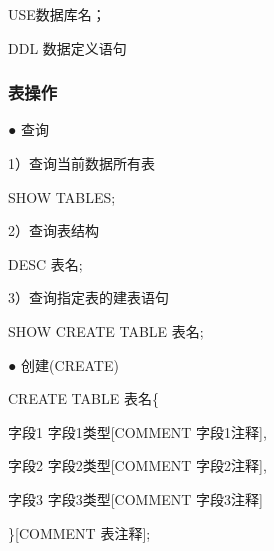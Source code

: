 \documentclass[
  letterpaper,
  DIV=11,
  numbers=noendperiod]{scrreprt}
\newenvironment{Shaded}{\begin{snugshade}}{\end{snugshade}}
\newcommand{\KeywordTok}[1]{\textcolor[rgb]{0.00,0.23,0.31}{#1}}
\newcommand{\NormalTok}[1]{\textcolor[rgb]{0.00,0.23,0.31}{#1}}
\begin{document}
\begin{Shaded}
\begin{Highlighting}[]
\NormalTok{USE数据库名；}
\end{Highlighting}
\end{Shaded}

DDL 数据定义语句

\hypertarget{ux8868ux64cdux4f5c}{%
\subsubsection{表操作}\label{ux8868ux64cdux4f5c}}

● 查询

1）查询当前数据所有表

\begin{Shaded}
\begin{Highlighting}[]
\NormalTok{SHOW }\KeywordTok{TABLES}\NormalTok{;}
\end{Highlighting}
\end{Shaded}

2）查询表结构

\begin{Shaded}
\begin{Highlighting}[]
\KeywordTok{DESC}\NormalTok{ 表名;}
\end{Highlighting}
\end{Shaded}

3）查询指定表的建表语句

\begin{Shaded}
\begin{Highlighting}[]
\NormalTok{SHOW }\KeywordTok{CREATE} \KeywordTok{TABLE}\NormalTok{ 表名;}
\end{Highlighting}
\end{Shaded}

● 创建(CREATE)

\begin{Shaded}
\begin{Highlighting}[]
\KeywordTok{CREATE} \KeywordTok{TABLE}\NormalTok{ 表名\{}

\NormalTok{字段1 字段1类型[}\KeywordTok{COMMENT}\NormalTok{ 字段1注释],}

\NormalTok{字段2 字段2类型[}\KeywordTok{COMMENT}\NormalTok{ 字段2注释],}

\NormalTok{字段3 字段3类型[}\KeywordTok{COMMENT}\NormalTok{ 字段3注释]}

\NormalTok{\}[}\KeywordTok{COMMENT}\NormalTok{ 表注释];}
\end{Highlighting}
\end{Shaded}
\end{document}
